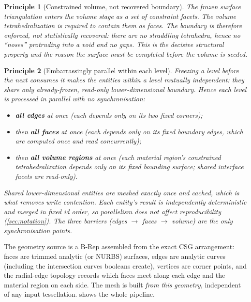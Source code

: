 \documentclass[11pt,a4paper]{article}
\numberwithin{equation}{section}
\newtheorem{principle}{Principle}[section]
\begin{document}
\begin{principle}[Constrained volume, not recovered boundary]
The frozen surface triangulation enters the volume stage as a set of
\emph{constraint facets}. The volume tetrahedralization is required to contain
them as faces. The boundary is therefore \emph{enforced}, not statistically
recovered: there are no straddling tetrahedra, hence no ``noses'' protruding
into a void and no gaps. This is the decisive structural property and the
reason the surface must be completed \emph{before} the volume is seeded.
\end{principle}

\begin{principle}[Embarrassingly parallel within each level]
\label{prin:parallel}
Freezing a level before the next consumes it makes the entities \emph{within} a
level mutually independent: they share only already-frozen, read-only
lower-dimensional boundary. Hence each level is processed in parallel with no
synchronisation:
\begin{itemize}[topsep=2pt,itemsep=1pt]
\item \textbf{all edges} at once (each depends only on its two fixed corners);
\item then \textbf{all faces} at once (each depends only on its fixed boundary
edges, which are computed once and read concurrently);
\item then \textbf{all volume regions} at once (each material region's
constrained tetrahedralization depends only on its fixed bounding surface;
shared interface facets are read-only).
\end{itemize}
Shared lower-dimensional entities are meshed exactly once and cached, which is
what removes write contention. Each entity's result is independently
deterministic and merged in fixed id order, so parallelism does not affect
reproducibility (\cref{sec:notation}). The three barriers (edges $\to$ faces
$\to$ volume) are the only synchronisation points.
\end{principle}

\noindent
The geometry source is a B-Rep assembled from the exact CSG arrangement: faces
are trimmed analytic (or NURBS) surfaces, edges are analytic curves (including
the intersection curves booleans create), vertices are corner points, and the
radial-edge topology records which faces meet along each edge and the material
region on each side. The mesh is built \emph{from this geometry}, independent of
any input tessellation.  shows the whole pipeline.
\end{document}
